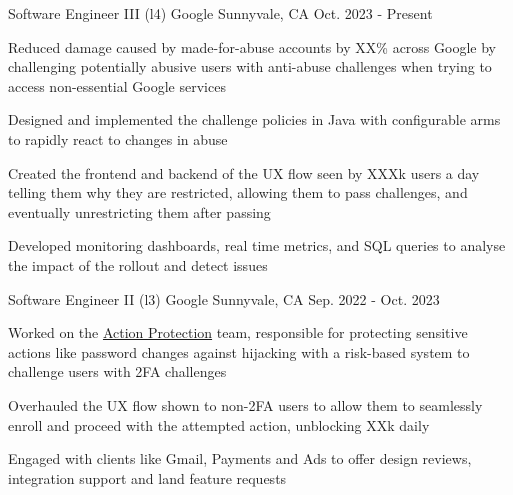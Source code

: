 
\hypersetup{
    colorlinks=true,
    linkcolor=blue,
    filecolor=magenta,
    urlcolor=awesome,
}



\begin{cventries}

  \cventry
	{Software Engineer III (l4)}
    {Google}
    {Sunnyvale, CA}
    {Oct. 2023 - Present}
    {
      \begin{cvitems}
        \item Reduced damage caused by made-for-abuse accounts by XX\% across Google by challenging potentially abusive users with anti-abuse challenges when trying to access non-essential Google services
		\item Designed and implemented the challenge policies in Java with configurable arms to rapidly react to changes in abuse
		\item Created the frontend and backend of the UX flow seen by XXXk users a day telling them why they are restricted, allowing them to pass challenges, and eventually unrestricting them after passing
		\item Developed monitoring dashboards, real time metrics, and SQL queries to analyse the impact of the rollout and detect issues
      \end{cvitems}
    }

  \cventry
	{Software Engineer II (l3)}
    {Google}
    {Sunnyvale, CA}
    {Sep. 2022 - Oct. 2023}
    {
      \begin{cvitems}
	  \item Worked on the \href{https://support.google.com/accounts/answer/7162782}{Action Protection} team, responsible for protecting sensitive actions like password changes against hijacking with a risk-based system to challenge users with 2FA challenges
	  \item Overhauled the UX flow shown to non-2FA users to allow them to seamlessly enroll and proceed with the attempted action, unblocking XXk daily
	  \item Engaged with clients like Gmail, Payments and Ads to offer design reviews, integration support and land feature requests
      \end{cvitems}
    }


\end{cventries}

